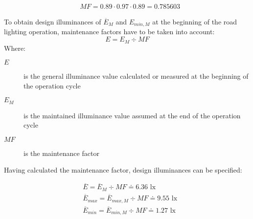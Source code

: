 \begin{align}
&MF = 0.89 \cdot 0.97 \cdot 0.89 = 0.785603
\end{align}

To obtain design illuminances of $\overline{E}_{M}$ and $E_{min,M}$ at the beginning of the road lighting operation, maintenance factors have to be taken into account:
\begin{equation}
E = E_{M} \div MF
\end{equation}
Where:
\begin{description}
	\item[$E$] is the general illuminance value calculated or measured at the beginning of the operation cycle
	\item[$E_{M}$] is the maintained illuminance value assumed at the end of the operation cycle
	\item[$MF$] is the maintenance factor
\end{description}

Having calculated the maintenance factor, design illuminances can be specified:

\begin{align}
&\overline{E} = \overline{E}_{M} \div MF \doteq 6.36 \text{ lx}\\
&\overline{E}_{max} = \overline{E}_{max,M} \div MF \doteq 9.55 \text{ lx}\\
&\overline{E}_{min} = \overline{E}_{min,M} \div MF \doteq 1.27 \text{ lx}\\
\end{align}
